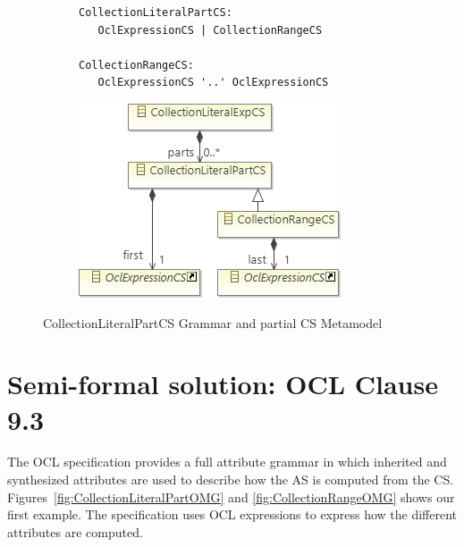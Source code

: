 \documentclass{llncs}
\begin{document}
\begin{figure}[htbp]
\centering
\begin{subfigure}{0.55\textwidth}
  \centering
\begin{lstlisting}[language=Xtext]
CollectionLiteralPartCS:
   OclExpressionCS | CollectionRangeCS
   
CollectionRangeCS:
   OclExpressionCS '..' OclExpressionCS
\end{lstlisting} 
\end{subfigure}%
\begin{subfigure}{0.45\textwidth}
  \centering
  \includegraphics[scale=0.5]{images/CollectionLiteralPartCS.png}
\end{subfigure}
\caption{CollectionLiteralPartCS Grammar and partial CS Metamodel}
\label{fig:CollectionLiteralPartCS}
\end{figure}

\section{Semi-formal solution: OCL Clause 9.3}
\label{sec:semi-formal-solution}

The OCL specification provides a full attribute grammar in which inherited and synthesized attributes are used to describe how the AS is computed from the CS. Figures~\ref{fig:CollectionLiteralPartOMG} and \ref{fig:CollectionRangeOMG} shows our first example. The specification uses OCL expressions to express how the different attributes are computed. %
\end{document}
